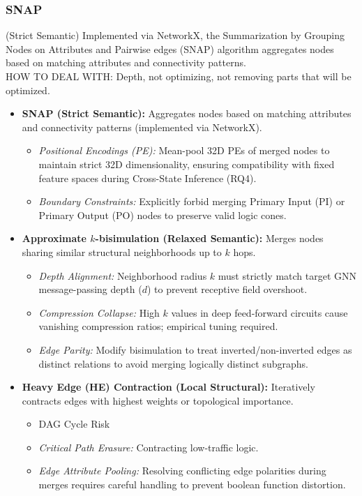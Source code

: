 \documentclass[paper=a4, fontsize=11pt]{scrartcl} %
\numberwithin{equation}{section} %
\numberwithin{figure}{section} %
\numberwithin{table}{section} %
\begin{document}


\subsubsection{SNAP} (Strict Semantic)
Implemented via NetworkX, the Summarization by Grouping Nodes on Attributes and Pairwise edges (SNAP) algorithm aggregates nodes based on matching attributes and connectivity patterns. \\

HOW TO DEAL WITH: Depth, not optimizing, not removing parts that will be optimized. 


\begin{itemize}
    \item \textbf{SNAP (Strict Semantic):} Aggregates nodes based on matching attributes and connectivity patterns (implemented via NetworkX).
    \begin{itemize}
        \item \textit{Positional Encodings (PE):} Mean-pool 32D PEs of merged nodes to maintain strict 32D dimensionality, ensuring compatibility with fixed feature spaces during Cross-State Inference (RQ4).
        \item \textit{Boundary Constraints:} Explicitly forbid merging Primary Input (PI) or Primary Output (PO) nodes to preserve valid logic cones.
    \end{itemize}


    \item \textbf{Approximate $k$-bisimulation (Relaxed Semantic):} Merges nodes sharing similar structural neighborhoods up to $k$ hops.
    \begin{itemize}
        \item \textit{Depth Alignment:} Neighborhood radius $k$ must strictly match target GNN message-passing depth ($d$) to prevent receptive field overshoot.
        \item \textit{Compression Collapse:} High $k$ values in deep feed-forward circuits cause vanishing compression ratios; empirical tuning required.
        \item \textit{Edge Parity:} Modify bisimulation to treat inverted/non-inverted edges as distinct relations to avoid merging logically distinct subgraphs.
    \end{itemize}

    \item \textbf{Heavy Edge (HE) Contraction (Local Structural):} Iteratively contracts edges with highest weights or topological importance.
    \begin{itemize}
        \item DAG Cycle Risk
        \item \textit{Critical Path Erasure:} Contracting low-traffic logic.
        \item \textit{Edge Attribute Pooling:} Resolving conflicting edge polarities during merges requires careful handling to prevent boolean function distortion.
    \end{itemize}



\end{itemize}
\end{document}
